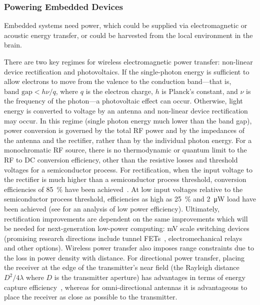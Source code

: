 \subsubsection{Powering Embedded Devices}

Embedded systems need power, which could be supplied via electromagnetic or acoustic energy transfer, or could be harvested from the local environment in the brain.

There are two key regimes for wireless electromagnetic power transfer: non-linear device rectification and photovoltaics.
If the single-photon energy is sufficient to allow electrons to move from the valence to the conduction band---that is, $\text{band gap} < h\nu/q$, where $q$ is the electron charge, $h$ is Planck's constant, and $\nu$ is the frequency of the photon---a photovoltaic effect can occur.
Otherwise, light energy is converted to voltage by an antenna and non-linear device rectification may occur.
In this regime (single photon energy much lower than the band gap), power conversion is governed by the total RF power and by the impedances of the antenna and the rectifier, rather than by the individual photon energy.
For a monochromatic RF source, there is no thermodynamic or quantum limit to the RF to DC conversion efficiency, other than the resistive losses and threshold voltages for a semiconductor process.
For rectification, when the input voltage to the rectifier is much higher than a semiconductor process threshold, conversion efficiencies of \SI{85}{\percent} have been achieved~\cite{sun02}.
At low input voltages relative to the semiconductor process threshold, efficiencies as high as \SI{25}{\percent} and \SI{2}{\micro\watt} load have been achieved (see \cite{mandal07} for an analysis of low power efficiency).
Ultimately, rectification improvements are dependent on the same improvements which will be needed for next-generation low-power computing: \si{\milli\volt} scale switching devices (promising research directions include tunnel FETs~\cite{ionescu11}, electromechanical relays~\cite{liu12} and other options).
Wireless power transfer also imposes range constraints due to the loss in power density with distance.
For directional power transfer, placing the receiver at the edge of the transmitter's near field (the Rayleigh distance $D^2/4\lambda$ where $D$ is the transmitter aperture) has advantages in terms of energy capture efficiency~\cite{ozeri10}, whereas for omni-directional antennas it is advantageous to place the receiver as close as possible to the transmitter.

